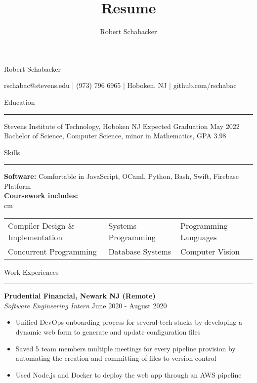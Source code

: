 \documentclass{article}
\title{Resume}
\author{Robert Schabacker}
\newcommand \spacingBetweenHeadings {0.5em}
\begin{document}
\begin{center}
{\Huge Robert Schabacker\par}
{\Large rschabac@stevens.edu  |  (973) 796 6965  |  Hoboken, NJ  |  github.com/rschabac\par}
\end{center}
\vspace{-0.7em}
\vspace{\spacingBetweenHeadings}

\noindent
\huge Education\par
\vspace{0.1em}
\hrule
\Large
\vspace{1em}
\noindent
Stevens Institute of Technology, Hoboken NJ
\hfill
Expected Graduation May 2022\\
Bachelor of Science, Computer Science, minor in Mathematics, GPA 3.98

\vspace{\spacingBetweenHeadings}

\noindent
\huge Skills\par
\vspace{0.1em}
\hrule
\Large
\vspace{1em}
\noindent
\textbf{Software:} Comfortable in JavaScript, OCaml, Python, Bash, Swift, Firebase Platform\\
\textbf{Coursework includes:}\\
 cm
\begin{tabular}{ l l l }
Compiler Design \& Implementation & Systems Programming & Programming Languages\\ 
Concurrent Programming            & Database Systems	& Computer Vision\\
\end{tabular}

\vspace{\spacingBetweenHeadings}

\noindent
\huge Work Experiences\par
\vspace{0.1em}
\hrule
\Large
\vspace{1em}
\noindent
\textbf{Prudential Financial, Newark NJ (Remote)}\\
\textit{Software Engineering Intern}
\hfill
June 2020 - August 2020\\
\vspace{-1em}
\begin{itemize}
\item Unified DevOps onboarding process for several tech stacks by developing a dynamic web form to generate and update configuration files
\item Saved 5 team members multiple meetings for every pipeline provision by automating the creation and committing of files to version control
\item Used Node.js and Docker to deploy the web app through an AWS pipeline
\end{itemize}
\end{document}

